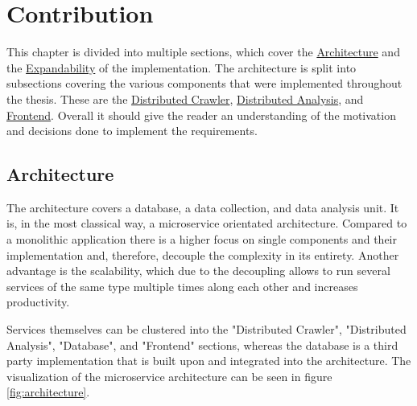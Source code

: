 \chapter{Contribution}
\label{sec:contribution}

This chapter is divided into multiple sections, which cover the \hyperref[sec:architecture]{Architecture} and the \hyperref[sec:expandability]{Expandability} of the implementation. The architecture is split into subsections covering the various components that were implemented throughout the thesis. These are the \hyperref[sec:crawler]{Distributed Crawler}, \hyperref[sec:distributed_analysis]{Distributed Analysis}, and \hyperref[sec:fronted]{Frontend}. Overall it should give the reader an understanding of the motivation and decisions done to implement the requirements.


\section{Architecture}
\label{sec:architecture}

The architecture covers a database, a data collection, and data analysis unit. It is, in the most classical way, a microservice orientated architecture. Compared to a monolithic application there is a higher focus on single components and their implementation and, therefore, decouple the complexity in its entirety. Another advantage is the scalability, which due to the decoupling allows to run several services of the same type multiple times along each other and increases productivity.

Services themselves can be clustered into the "Distributed Crawler", "Distributed Analysis", "Database", and "Frontend" sections, whereas the database is a third party implementation that is built upon and integrated into the architecture. The visualization of the microservice architecture can be seen in figure \ref{fig:architecture}.

